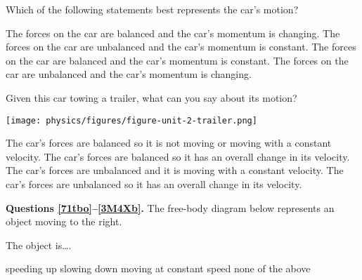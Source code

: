\documentclass[answers]{exam}
\newif\ifversionKlevel
\begin{document}
\begin{questions}
Which of the following statements best represents the car’s motion?

\begin{randomizechoices}[norandomize]
    \choice The forces on the car are balanced and the car’s momentum is changing.			
    \choice The forces on the car are unbalanced and the car’s momentum is constant.
    \choice The forces on the car are balanced and the car’s momentum is constant.
    \correctchoice The forces on the car are unbalanced and the car’s momentum is changing.
\end{randomizechoices}

\question
Given this car towing a trailer, what can you say about its motion?

\begin{center}
    \texttt{[image: physics/figures/figure-unit-2-trailer.png]}
\end{center}

\begin{randomizechoices}[norandomize]
    \choice The car’s forces are balanced so it is not moving or moving with a constant velocity.
    \choice The car’s forces are balanced so it has an overall change in its velocity.
    \choice The car’s forces are unbalanced and it is moving with a constant velocity.
    \correctchoice The car’s forces are unbalanced so it has an overall change in its velocity.    
\end{randomizechoices}


\ifversionKlevel
\begin{EnvUplevel}
    \textbf{Questions \ref{71tbo}--\ref{3M4Xb}.} The free-body diagram below represents an object moving to the right.
\end{EnvUplevel}


\begin{center}
\end{center}

\question \label{71tbo}
The object is\dots .

\begin{randomizechoices}
    \choice speeding up
    \correctchoice slowing down
    \choice moving at constant speed 
    \choice none of the above
\end{randomizechoices}


\end{questions}
\end{document}
